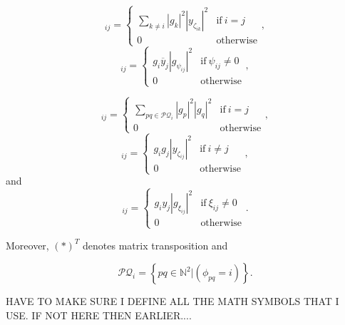 \documentclass[useAMS,usenatbib]{mn2e}
\newcommand{\bC}{\bmath{C}}
\newcommand{\bE}{\bmath{E}}
\newcommand{\bF}{\bmath{F}}
\newcommand{\bD}{\bmath{D}}
\newcommand{\conj}[1]{\overline{#1}}
\begin{document}
\begin{equation}
[\bC]_{ij} = 
\begin{cases}
 \sum_{k \neq i} \left | g_k \right |^2 \left | y_{\zeta_{ik}} \right |^2 & \textrm{if} ~ i=j\\
 0 & \textrm{otherwise}
\end{cases},
\end{equation}
\begin{equation}
[\bD]_{ij} = 
\begin{cases}
 g_i \conj{y}_j  \left | g_{\psi_{ij}} \right |^2  & \textrm{if} ~ \psi_{ij}\neq0\\
 0 & \textrm{otherwise}
\end{cases},
\end{equation}

\begin{equation}
[\bE]_{ij} = 
\begin{cases}
 \sum_{pq \in \mathcal{PQ}_i} \left | g_p \right |^2 \left | g_q \right |^2  & \textrm{if} ~ i=j\\
 0 & \textrm{otherwise}
\end{cases},
\end{equation}
\begin{equation}
[\bF]_{ij} = 
\begin{cases}
 g_i g_j  \left | y_{\zeta_{ij}} \right |^2  & \textrm{if} ~ i \neq j\\
 0 & \textrm{otherwise}
\end{cases},
\end{equation}
and
\begin{equation}
[\boldsymbol{G}]_{ij} = 
\begin{cases}
 g_i y_j  \left | g_{\xi_{ij}} \right |^2  & \textrm{if} ~ \xi_{ij}\neq0\\
 0 & \textrm{otherwise}
\end{cases}.
\end{equation}

Moreover, $(*)^T$ denotes matrix transposition and

\begin{equation}
\mathcal{PQ}_i = \left\{pq\in\mathbb{N}^2|(\phi_{pq} = i) \right\}.
\end{equation}

HAVE TO MAKE SURE I DEFINE ALL THE MATH SYMBOLS THAT I USE. IF NOT HERE THEN EARLIER....
\end{document}
